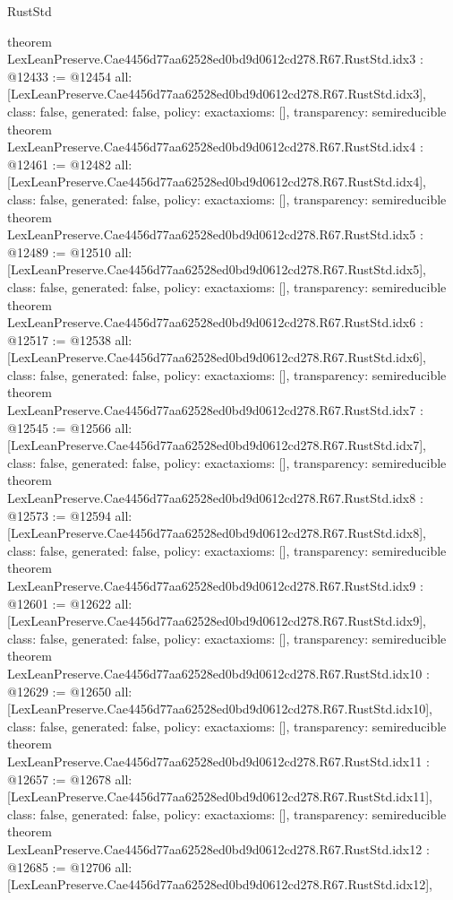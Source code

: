 \begin{lexlean}{RustStd}
\begin{coremodule}
{}
theorem LexLeanPreserve.Cae4456d77aa62528ed0bd9d0612cd278.R67.RustStd.idx3 : @12433 := @12454 {
  all: [LexLeanPreserve.Cae4456d77aa62528ed0bd9d0612cd278.R67.RustStd.idx3],
  class: false,
  generated: false,
  policy: exact{axioms: []},
  transparency: semireducible
}
theorem LexLeanPreserve.Cae4456d77aa62528ed0bd9d0612cd278.R67.RustStd.idx4 : @12461 := @12482 {
  all: [LexLeanPreserve.Cae4456d77aa62528ed0bd9d0612cd278.R67.RustStd.idx4],
  class: false,
  generated: false,
  policy: exact{axioms: []},
  transparency: semireducible
}
theorem LexLeanPreserve.Cae4456d77aa62528ed0bd9d0612cd278.R67.RustStd.idx5 : @12489 := @12510 {
  all: [LexLeanPreserve.Cae4456d77aa62528ed0bd9d0612cd278.R67.RustStd.idx5],
  class: false,
  generated: false,
  policy: exact{axioms: []},
  transparency: semireducible
}
theorem LexLeanPreserve.Cae4456d77aa62528ed0bd9d0612cd278.R67.RustStd.idx6 : @12517 := @12538 {
  all: [LexLeanPreserve.Cae4456d77aa62528ed0bd9d0612cd278.R67.RustStd.idx6],
  class: false,
  generated: false,
  policy: exact{axioms: []},
  transparency: semireducible
}
theorem LexLeanPreserve.Cae4456d77aa62528ed0bd9d0612cd278.R67.RustStd.idx7 : @12545 := @12566 {
  all: [LexLeanPreserve.Cae4456d77aa62528ed0bd9d0612cd278.R67.RustStd.idx7],
  class: false,
  generated: false,
  policy: exact{axioms: []},
  transparency: semireducible
}
theorem LexLeanPreserve.Cae4456d77aa62528ed0bd9d0612cd278.R67.RustStd.idx8 : @12573 := @12594 {
  all: [LexLeanPreserve.Cae4456d77aa62528ed0bd9d0612cd278.R67.RustStd.idx8],
  class: false,
  generated: false,
  policy: exact{axioms: []},
  transparency: semireducible
}
theorem LexLeanPreserve.Cae4456d77aa62528ed0bd9d0612cd278.R67.RustStd.idx9 : @12601 := @12622 {
  all: [LexLeanPreserve.Cae4456d77aa62528ed0bd9d0612cd278.R67.RustStd.idx9],
  class: false,
  generated: false,
  policy: exact{axioms: []},
  transparency: semireducible
}
theorem LexLeanPreserve.Cae4456d77aa62528ed0bd9d0612cd278.R67.RustStd.idx10 : @12629 := @12650 {
  all: [LexLeanPreserve.Cae4456d77aa62528ed0bd9d0612cd278.R67.RustStd.idx10],
  class: false,
  generated: false,
  policy: exact{axioms: []},
  transparency: semireducible
}
theorem LexLeanPreserve.Cae4456d77aa62528ed0bd9d0612cd278.R67.RustStd.idx11 : @12657 := @12678 {
  all: [LexLeanPreserve.Cae4456d77aa62528ed0bd9d0612cd278.R67.RustStd.idx11],
  class: false,
  generated: false,
  policy: exact{axioms: []},
  transparency: semireducible
}
theorem LexLeanPreserve.Cae4456d77aa62528ed0bd9d0612cd278.R67.RustStd.idx12 : @12685 := @12706 {
  all: [LexLeanPreserve.Cae4456d77aa62528ed0bd9d0612cd278.R67.RustStd.idx12],
}
\end{coremodule}
\end{lexlean}
